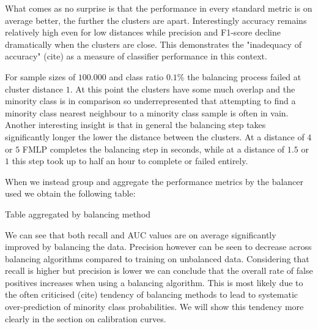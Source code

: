 What comes as no surprise is that the performance in every standard metric is on average better, the further the clusters are apart. 
Interestingly accuracy remains relatively high even for low distances while precision and F1-score decline dramatically when the clusters are close.
This demonstrates the "inadequacy of accuracy" (cite) as a measure of classifier performance in this context.

For sample sizes of $100.000$ and class ratio $0.1\%$ the balancing process failed at cluster distance $1$. 
At this point the clusters have some much overlap and the minority class is in comparison so underrepresented 
that attempting to find a minority class nearest neighbour to a minority class sample is often in vain.
Another interesting insight is that in general the balancing step takes significantly longer the lower the distance between the clusters.
At a distance of $4$ or $5$ FMLP completes the balancing step in seconds, while at a distance of $1.5$ or $1$ this step took up to half an hour to complete or failed entirely.

When we instead group and aggregate the performance metrics by the balancer used we obtain the following table:

\begin{table}[H]
\centering
\caption{Table aggregated by balancing method}
\end{table}

We can see that both recall and AUC values are on average significantly improved by balancing the data.
Precision however can be seen to decrease across balancing algorithms compared to training on unbalanced data.
Considering that recall is higher but precision is lower we can conclude that the overall rate of false positives increases when using a balancing algorithm.
This is most likely due to the often criticised (cite) tendency of balancing methods to lead to systematic over-prediction of minority class probabilities.\cite{harm_imbalance}
We will show this tendency more clearly in the section on calibration curves.

